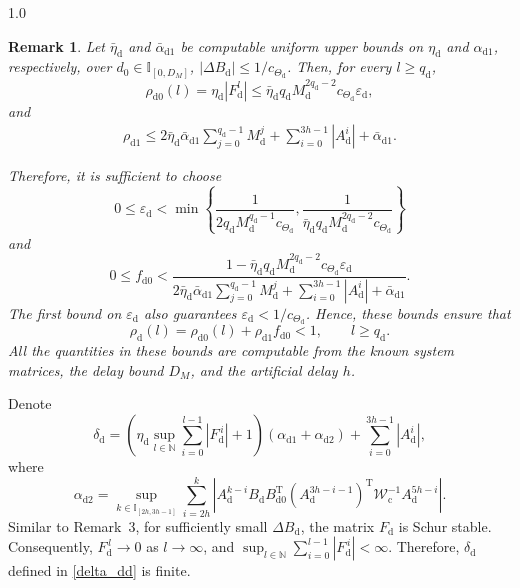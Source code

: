 \documentclass[journal]{IEEEtran}
\newtheorem{remark}{Remark}
\begin{document}
\begin{spacing}{1.0}
\begin{remark}
Let $\bar{\eta}_{\mathrm d}$ and
$\bar{\alpha}_{\mathrm d1}$ be computable uniform upper bounds
on $\eta_{\mathrm d}$ and $\alpha_{\mathrm d1}$, respectively,
over $d_{0}\in\mathbb{I}_{[0,D_{M}]}$,
$|\mathit{\Delta}B_{\mathrm d}|
\leq
1/c_{\mathit{\Theta}_{\mathrm d}}$.
Then, for every $l\geq q_{\mathrm d}$,
\[
\rho_{\mathrm d0}(l)
=
\eta_{\mathrm d}|F_{\mathrm d}^{l}|
\leq
\bar{\eta}_{\mathrm d}
q_{\mathrm d}
M_{\mathrm d}^{2q_{\mathrm d}-2}
c_{\mathit{\Theta}_{\mathrm d}}
\varepsilon_{\mathrm d},
\]
and
\[
\begin{aligned}
\rho_{\mathrm d1}
\leq{}
2\bar{\eta}_{\mathrm d}
\bar{\alpha}_{\mathrm d1}
\sum_{j=0}^{q_{\mathrm d}-1}M_{\mathrm d}^{j}+
\sum_{i=0}^{3h-1}|A_{\mathrm d}^{i}|
+
\bar{\alpha}_{\mathrm d1}.
\end{aligned}
\]

Therefore, it is sufficient to choose
\[
0\leq\varepsilon_{\mathrm d}
<
\min\left\{
\frac{1}{
2q_{\mathrm d}
M_{\mathrm d}^{q_{\mathrm d}-1}
c_{\mathit{\Theta}_{\mathrm d}}
},
\frac{1}{
\bar{\eta}_{\mathrm d}
q_{\mathrm d}
M_{\mathrm d}^{2q_{\mathrm d}-2}
c_{\mathit{\Theta}_{\mathrm d}}
}
\right\}
\]
and
\[
0\leq f_{\mathrm d0}
<
\frac{
1-
\bar{\eta}_{\mathrm d}
q_{\mathrm d}
M_{\mathrm d}^{2q_{\mathrm d}-2}
c_{\mathit{\Theta}_{\mathrm d}}
\varepsilon_{\mathrm d}
}{
2\bar{\eta}_{\mathrm d}
\bar{\alpha}_{\mathrm d1}
\displaystyle\sum_{j=0}^{q_{\mathrm d}-1}M_{\mathrm d}^{j}
+
\displaystyle\sum_{i=0}^{3h-1}|A_{\mathrm d}^{i}|
+
\bar{\alpha}_{\mathrm d1}
}.
\]
The first bound on $\varepsilon_{\mathrm d}$ also guarantees
$\varepsilon_{\mathrm d}
<1/c_{\mathit{\Theta}_{\mathrm d}}$.
Hence, these bounds ensure that
\[
\rho_{\mathrm d}(l)
=
\rho_{\mathrm d0}(l)
+
\rho_{\mathrm d1}f_{\mathrm d0}
<1,
\qquad
l\geq q_{\mathrm d}.
\]
All the quantities in these bounds are computable from the
known system matrices, the delay bound $D_{M}$, and the
artificial delay $h$.
\end{remark}


Denote%
\begin{equation}
\delta_{\mathrm d}=\left(\eta_{\mathrm d}\sup_{l\in\mathbb N}\sum_{i=0}^{l-1}\left|F_{\mathrm d}^{\,i}\right|+1\right)(\alpha_{\mathrm d1}+\alpha_{\mathrm d2})+\sum_{i=0}^{3h-1}\left|A_{\mathrm d}^{i}\right|,
\label{delta_dd}
\end{equation}
where
\begin{equation}
\alpha_{\mathrm{d}2}=\sup_{k\in \mathbb{I}_{[2h,3h-1]}}%
{\displaystyle\sum_{i=2h}^{k}}
\left\vert A_{\mathrm{d}}^{k-i}B_{\mathrm{d}}B_{\mathrm{d}0}^{\mathrm{T}%
}(A_{\mathrm{d}}^{3h-i-1})^{\mathrm{T}}\mathcal{W}_{\mathrm{c}}^{-1}%
A_{\mathrm{d}}^{5h-i}\right\vert . \label{alpha_2}%
\end{equation}
Similar to Remark~3, for sufficiently small $\mathit{\Delta}B_{\mathrm{d}}$,
the matrix \(F_{\mathrm d}\) is Schur stable. Consequently,
\(F_{\mathrm d}^{\,l}\to 0\) as \(l\to\infty\), and
$\sup_{l\in\mathbb{N}}
\sum_{i=0}^{l-1}
\left|F_{\mathrm d}^{\,i}\right|
<\infty$.
Therefore, \(\delta_{\mathrm d}\) defined in
\eqref{delta_dd} is finite.


\end{spacing}
\end{document}
